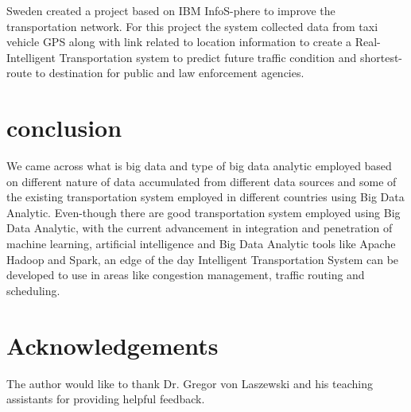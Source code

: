 \documentclass[sigconf]{acmart}
\begin{document}
Sweden created a project based on IBM InfoS-phere \cite{bdlt} to improve the transportation network. For this project the system collected data from taxi vehicle GPS along with link related to location information to create a Real-Intelligent Transportation system to predict future traffic condition and shortest-route to destination for public and law enforcement agencies.


\section{conclusion}

We came across what is big data and type of big data analytic employed based on different nature of data accumulated from different data sources and some of the existing transportation system employed in different countries using Big Data Analytic. Even-though there are good transportation system employed using Big Data Analytic, with the current advancement in integration and penetration of machine learning, artificial intelligence and Big Data Analytic tools like Apache Hadoop and Spark, an edge of the day Intelligent Transportation System can be developed to use in areas like congestion management, traffic routing and scheduling.

\section*{Acknowledgements}

The author would like to thank Dr. Gregor von Laszewski and his teaching assistants for providing helpful feedback.




\end{document}
